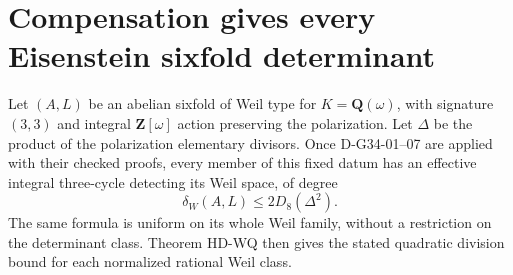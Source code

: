\section{Compensation gives every Eisenstein sixfold determinant}

\begin{theorem}
\label{HD-E6}
Let $(A,L)$ be an abelian sixfold of Weil type for
$K=\mathbf Q(\omega)$, with signature $(3,3)$ and integral
$\mathbf Z[\omega]$ action preserving the polarization. Let $\Delta$
be the product of the polarization elementary divisors. Once
D-G34-01--07 are applied with their checked proofs, every member of
this fixed datum has an effective integral three-cycle detecting its
Weil space, of degree
\[
 \delta_W(A,L)\le 2D_8(\Delta^2).
\]
The same formula is uniform on its whole Weil family, without a
restriction on the determinant class. Theorem HD-WQ then gives the
stated quadratic division bound for each normalized rational Weil class.
\end{theorem}
